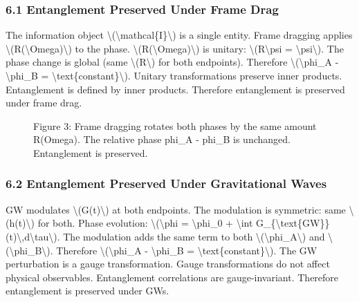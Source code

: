 \documentclass[
  10pt,
]{article}
\begin{document}
\hypertarget{entanglement-preserved-under-frame-drag}{%
\subsubsection{6.1 Entanglement Preserved Under Frame
Drag}\label{entanglement-preserved-under-frame-drag}}

The information object
\textbackslash(\textbackslash mathcal\{I\}\textbackslash) is a single
entity. Frame dragging applies
\textbackslash(R(\textbackslash Omega)\textbackslash) to the phase.
\textbackslash(R(\textbackslash Omega)\textbackslash) is unitary:
\textbackslash(\textbar R\textbackslash psi\textbar{} =
\textbar\textbackslash psi\textbar\textbackslash). The phase change is
global (same \textbackslash(R\textbackslash) for both endpoints).
Therefore \textbackslash(\textbackslash phi\_A - \textbackslash phi\_B =
\textbackslash text\{constant\}\textbackslash). Unitary transformations
preserve inner products. Entanglement is defined by inner products.
Therefore entanglement is preserved under frame drag.

\begin{figure}
\centering

\caption{Figure 3: Frame dragging rotates both phases by the same amount
R(Omega). The relative phase phi\_A - phi\_B is unchanged. Entanglement
is preserved.}
\end{figure}

\hypertarget{entanglement-preserved-under-gravitational-waves}{%
\subsubsection{6.2 Entanglement Preserved Under Gravitational
Waves}\label{entanglement-preserved-under-gravitational-waves}}

GW modulates \textbackslash(G(t)\textbackslash) at both endpoints. The
modulation is symmetric: same \textbackslash(h(t)\textbackslash) for
both. Phase evolution: \textbackslash(\textbackslash phi =
\textbackslash phi\_0 + \textbackslash int
G\_\{\textbackslash text\{GW\}\}(t)\textbackslash,d\textbackslash tau\textbackslash).
The modulation adds the same term to both
\textbackslash(\textbackslash phi\_A\textbackslash) and
\textbackslash(\textbackslash phi\_B\textbackslash). Therefore
\textbackslash(\textbackslash phi\_A - \textbackslash phi\_B =
\textbackslash text\{constant\}\textbackslash). The GW perturbation is a
gauge transformation. Gauge transformations do not affect physical
observables. Entanglement correlations are gauge-invariant. Therefore
entanglement is preserved under GWs.
\end{document}
